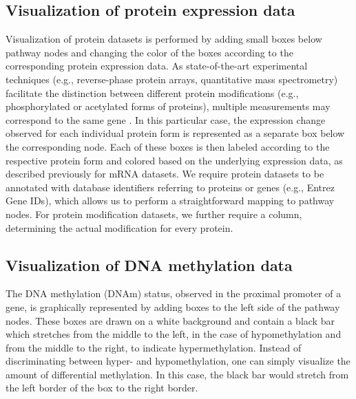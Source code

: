 \documentclass{bioinfo}
\begin{document}
\subsection{Visualization of protein expression data}

Visualization of protein datasets is performed by adding small boxes below pathway nodes and
changing the color of the boxes according to the corresponding protein expression data. As state-of-the-art
experimental techniques (e.g., reverse-phase protein arrays, quantitative mass spectrometry)
facilitate the distinction between different protein modifications (e.g., phosphorylated or
acetylated forms of proteins), multiple measurements may correspond to the same gene \citep{Pirnia2009, Yates2009}.
In this particular case, the expression change observed for each individual protein form is represented
as a separate box below the corresponding node. Each of these boxes is then labeled according to the
respective protein form and colored based on the underlying expression data, as described previously
for mRNA datasets. We require protein datasets to be annotated with database identifiers referring
to proteins or genes (e.g., Entrez Gene IDs), which allows us to perform a straightforward mapping to
pathway nodes. For protein modification datasets, we further require a column, determining the
actual modification for every protein.


\subsection{Visualization of DNA methylation data}

The DNA methylation (DNAm) status, observed in the proximal promoter of a gene, is graphically
represented by adding boxes to the left side of the pathway nodes. These boxes are drawn on a white
background and contain a black bar which stretches from the middle to the left, in the case of hypomethylation and from the middle to the right, to indicate hypermethylation. Instead of discriminating between hyper- and hypomethylation, one can simply visualize the amount of differential methylation. In this case, the black bar would stretch from the left border of the box to the right border.
\end{document}
